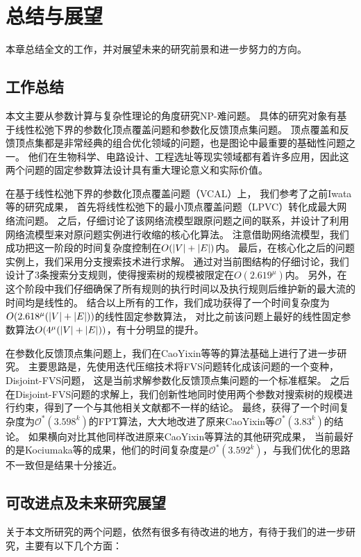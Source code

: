﻿\chapter{总结与展望}

本章总结全文的工作，并对展望未来的研究前景和进一步努力的方向。

\section{工作总结}
本文主要从参数计算与复杂性理论的角度研究NP-难问题。
具体的研究对象有基于线性松弛下界的参数化顶点覆盖问题和参数化反馈顶点集问题。
顶点覆盖和反馈顶点集都是非常经典的组合优化领域的问题，也是图论中最重要的基础性问题之一。
他们在生物科学、电路设计、工程选址等现实领域都有着许多应用，因此这两个问题的固定参数算法设计具有重大理论意义和实际价值。

在基于线性松弛下界的参数化顶点覆盖问题（VCAL）上，
我们参考了之前Iwata等的研究成果，
首先将线性松弛下的最小顶点覆盖问题（LPVC）转化成最大网络流问题。
之后，仔细讨论了该网络流模型跟原问题之间的联系，并设计了利用网络流模型来对原问题实例进行收缩的核心化算法。
注意借助网络流模型，我们成功把这一阶段的时间复杂度控制在$O(\left\vert V \right\vert + \left\vert E \right\vert)$内。
最后，在核心化之后的问题实例上，我们采用分支搜索技术进行求解。
通过对当前图结构的仔细讨论，我们设计了3条搜索分支规则，使得搜索树的规模被限定在$O(2.619^\mu)$内。
另外，在这个阶段中我们仔细确保了所有规则的执行时间以及执行规则后维护新的最大流的时间均是线性的。
结合以上所有的工作，我们成功获得了一个时间复杂度为$O(2.618^\mu(\left\vert V \right\vert + \left\vert E \right\vert))$的线性固定参数算法，
对比之前该问题上最好的线性固定参数算法$O(4^\mu(\left\vert V \right\vert + \left\vert E \right\vert))$，有十分明显的提升。


在参数化反馈顶点集问题上，我们在CaoYixin等等的算法基础上进行了进一步研究。
主要思路是，先使用迭代压缩技术将FVS问题转化成该问题的一个变种，Disjoint-FVS问题，
这是当前求解参数化反馈顶点集问题的一个标准框架。
之后在Disjoint-FVS问题的求解上，我们创新性地同时使用两个参数对搜索树的规模进行约束，得到了一个与其他相关文献都不一样的结论。
最终，获得了一个时间复杂度为$\mathcal{O}^*(3.598^k)$的FPT算法，大大地改进了原来CaoYixin等$\mathcal{O}^*(3.83^k)$的结论。
如果横向对比其他同样改进原来CaoYixin等算法的其他研究成果，
当前最好的是Kociumaka等的成果，他们的时间复杂度是$\mathcal{O}^*(3.592^k)$，与我们优化的思路不一致但是结果十分接近。


\section{可改进点及未来研究展望}
关于本文所研究的两个问题，依然有很多有待改进的地方，有待于我们的进一步研究，主要有以下几个方面： 

